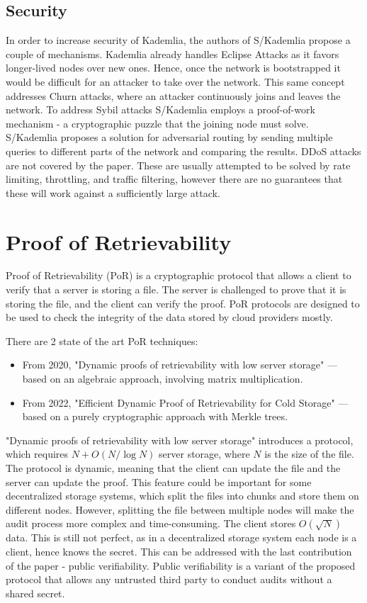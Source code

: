 \subsection{Security}

In order to increase security of Kademlia, the authors of S/Kademlia \cite{skademlia} propose a couple of
mechanisms.
Kademlia already handles Eclipse Attacks as it favors longer-lived nodes over new ones.
Hence, once the network is bootstrapped it would be difficult for an attacker to take over the network.
This same concept addresses Churn attacks, where an attacker continuously joins and leaves the network.
To address Sybil attacks S/Kademlia employs a proof-of-work mechanism - a cryptographic puzzle that
the joining node must solve.
S/Kademlia proposes a solution for adversarial routing by sending multiple queries to different parts
of the network and comparing the results.
DDoS attacks are not covered by the paper.
These are usually attempted to be solved by rate limiting, throttling, and traffic filtering,
however there are no guarantees that these will work against a sufficiently large attack.

\section{Proof of Retrievability}

Proof of Retrievability (PoR) \cite{porfirst} is a cryptographic protocol that
allows a client to verify that a server is storing a file.
The server is challenged to prove that it is storing the file, and the client
can verify the proof.
PoR protocols are designed to be used to check the integrity of the data stored by cloud providers mostly.

There are 2 state of the art PoR techniques:
\begin{itemize}
    \item From 2020, "Dynamic proofs of retrievability with low server storage" \cite{poralgebra} —
        based on an algebraic approach, involving matrix multiplication.
    \item From 2022, "Efficient Dynamic Proof of Retrievability for Cold Storage" \cite{pormerkle} —
        based on a purely cryptographic approach with Merkle trees.
\end{itemize}

"Dynamic proofs of retrievability with low server storage" introduces a protocol, which 
requires $N + O(N/\log N)$ server storage, where $N$ is the size of the file.
The protocol is dynamic, meaning that the client can update the file and the server can update the proof.
This feature could be important for some decentralized storage systems, which split the files into chunks and
store them on different nodes.
However, splitting the file between multiple nodes will make the audit process more complex and time-consuming.
The client stores $O(\sqrt{N})$ data.
This is still not perfect, as in a decentralized storage system each node is a client, hence knows the secret.
This can be addressed with the last contribution of the paper - public verifiability.
Public verifiability is a variant of the proposed protocol that allows any untrusted third party
to conduct audits without a shared secret.


